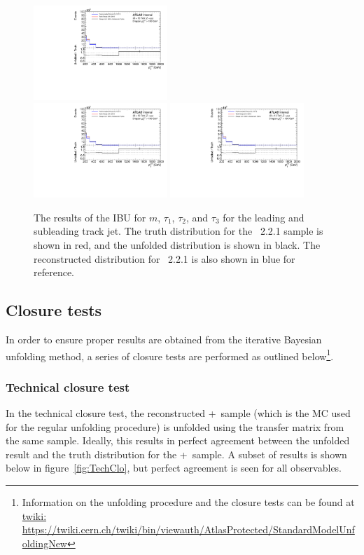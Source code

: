 \begin{figure}[h!]
  \includegraphics[page=22,width=0.45\textwidth]{figures/IBUPlots.pdf} \\
  \includegraphics[page=16,width=0.45\textwidth]{figures/IBUPlots.pdf}
  \includegraphics[page=23,width=0.45\textwidth]{figures/IBUPlots.pdf}
  \caption{The results of the IBU for $m$, $\tau_1$, $\tau_2$, and $\tau_3$ for the leading and subleading track jet. The truth distribution for the \sherpa~2.2.1 sample is shown in red, and the unfolded distribution is shown in black. The reconstructed distribution for \sherpa~2.2.1 is also shown in blue for reference.}
  \label{fig:UnfoldIBUTJ2}
\end{figure}
\clearpage

\subsection{Closure tests}
In order to ensure proper results are obtained from the iterative Bayesian unfolding method, a series of closure tests are performed as outlined below\footnote{Information on the unfolding procedure and the closure tests can be found at \url{twiki: https://twiki.cern.ch/twiki/bin/viewauth/AtlasProtected/StandardModelUnfoldingNew}}.
\subsubsection{Technical closure test}
In the technical closure test, the reconstructed \powheg+\pythia~sample (which is the MC used for the regular unfolding procedure) is unfolded using the transfer matrix from the same sample. Ideally, this results in perfect agreement between the unfolded result and the truth distribution for the \powheg+\pythia~sample.
A subset of results is shown below in figure~\ref{fig:TechClo}, but perfect agreement is seen for all observables.

